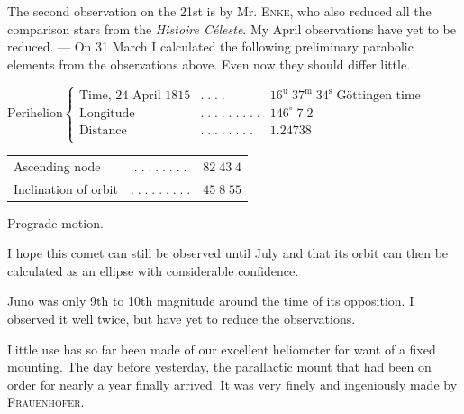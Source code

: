 \par\indent The second observation on the 21st is by Mr. \textsc{Enke}, who also reduced all the comparison stars from the \emph{Histoire Céleste}. My April observations have yet to be reduced. --- On 31 March I calculated the following preliminary parabolic elements from the observations above. Even now they should differ little.

\begin{center}\fontsize{9}{11}\selectfont $\text{Perihelion}\left\{\begin{array}{lcr}
\text{Time, 24 April 1815} & .\;.\;.\;. & 16^{\mathrm u}\;37^{\mathrm m}\;34^{\mathrm s}\;\text{Göttingen time}\\
\text{Longitude} & .\;.\;.\;.\;.\;.\;.\;.\;. & 146^\circ\;7\;2\\
\text{Distance} & .\;.\;.\;.\;.\;.\;.\;. & 1.24738\\
\end{array}\right.$\end{center}
\begin{center}\fontsize{10}{12}\selectfont\setlength{\tabcolsep}{3pt}\renewcommand{\arraystretch}{1.15}\begin{tabular}{lcr}
Ascending node & $.\;.\;.\;.\;.\;.\;.\;.$ & $82\;43\;4$\\
Inclination of orbit & $.\;.\;.\;.\;.\;.\;.\;.\;.$ & $45\;8\;55$\\
\end{tabular}\end{center}
\noindent Prograde motion.

\par\indent I hope this comet can still be observed until July and that its orbit can then be calculated as an ellipse with considerable confidence.

\par\indent Juno was only 9th to 10th magnitude around the time of its opposition. I observed it well twice, but have yet to reduce the observations.

\par\indent Little use has so far been made of our excellent heliometer for want of a fixed mounting. The day before yesterday, the parallactic mount that had been on order for nearly a year finally arrived. It was very finely and ingeniously made by \textsc{Frauenhofer}.
